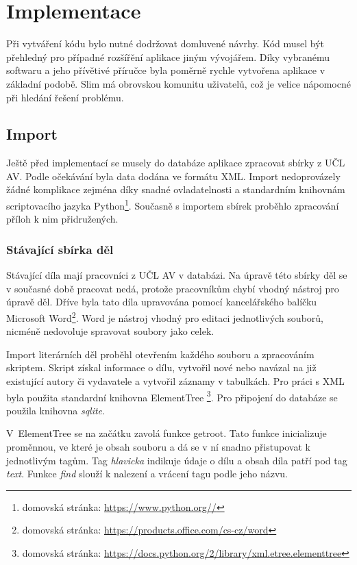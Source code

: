 \chapter{Implementace}
    Při vytváření kódu bylo nutné dodržovat domluvené návrhy. Kód musel být přehledný pro případné rozšířění aplikace jiným vývojářem. Díky vybranému softwaru a jeho přívětivé příručce byla poměrně rychle vytvořena aplikace v základní podobě. Slim má obrovskou komunitu uživatelů, což je velice nápomocné při hledání řešení problému. 

    \section{Import}
        Ještě před implementací se musely do databáze aplikace zpracovat sbírky z UČL AV. Podle očekávání byla data dodána ve formátu XML. Import nedoprovázely žádné komplikace zejména díky snadné ovladatelnosti a standardním knihovnám scriptovacího jazyka Python\footnote{domovská stránka: \url{https://www.python.org//}}. Současně s importem sbírek proběhlo zpracování příloh k nim přidružených.
        
        \subsection{Stávající sbírka děl}
            Stávající díla mají pracovníci z UČL AV v databázi. Na úpravě této sbírky děl se v současné době pracovat nedá, protože pracovníkům chybí vhodný nástroj pro úpravě děl. Dříve byla tato díla upravována pomocí kancelářského balíčku Microsoft Word\footnote{domovská stránka: \url{https://products.office.com/cs-cz/word}}. Word je nástroj vhodný pro editaci jednotlivých souborů, nicméně nedovoluje spravovat soubory jako celek.
            
            Import literárních děl proběhl otevřením každého souboru a zpracováním skriptem. Skript získal informace o dílu, vytvořil nové nebo navázal na již existující autory či vydavatele a vytvořil záznamy v tabulkách. Pro práci s XML byla použita standardní knihovna ElementTree
            \footnote{domovská stránka: \href{https://docs.python.org/2/library/xml.etree .elementtree.html}{\url{ https://docs.python.org/2/library/xml.etree.elementtree}}}. Pro připojení do databáze se použila knihovna \textit{sqlite}.
            
            V~ElementTree se na začátku zavolá funkce getroot. Tato funkce inicializuje proměnnou, ve které je obsah souboru a  dá se v ní snadno přistupovat k jednotlivým tagům. Tag \textit{hlavicka} indikuje údaje o dílu a obsah díla patří pod tag \textit{text}. Funkce \textit{find} slouží k nalezení a vrácení tagu podle jeho názvu.
            
